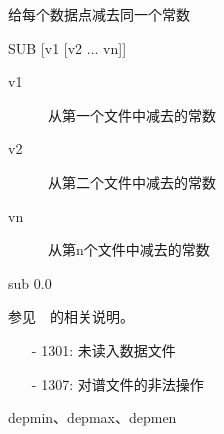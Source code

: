\label{cmd:sub}

给每个数据点减去同一个常数

\begin{SACSTX}
SUB  [v1 [v2 ... vn]]
\end{SACSTX}

\begin{description}
\item [v1] 从第一个文件中减去的常数 
\item [v2] 从第二个文件中减去的常数 
\item [vn] 从第n个文件中减去的常数 
\end{description}

\begin{SACDFT}
sub 0.0
\end{SACDFT}

参见~~的相关说明。

\begin{itemize}
\item[-]1301: 未读入数据文件
\item[-]1307: 对谱文件的非法操作
\end{itemize}

depmin、depmax、depmen

